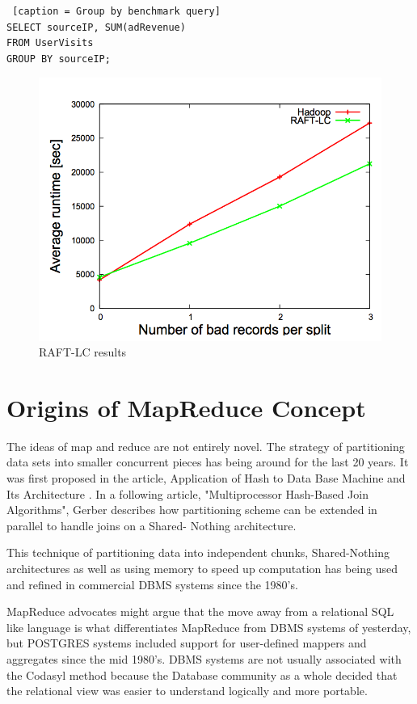 \documentclass[10pt,twocolumn]{IEEEtran11}
\begin{document}
\begin{lstlisting} [caption = Group by benchmark query]
SELECT sourceIP, SUM(adRevenue)
FROM UserVisits
GROUP BY sourceIP;
\end{lstlisting}

\begin{figure}[h]
	\centering
	\includegraphics[scale=0.6]{images/raftBenchmark.png}
	\caption{ RAFT-LC results \protect\cite{quiane2011rafting}}
	\label{fig:raftPerformance}
\end{figure}

\section{Origins of MapReduce Concept}

The ideas of map and reduce are not entirely novel.  The strategy of partitioning  data sets into smaller concurrent pieces has being around for the last 20 years.  It was first proposed in the article, Application of Hash to Data Base Machine and Its Architecture \cite{kitsuregawa1983application}.   In a following article, "Multiprocessor Hash-Based Join Algorithms"\cite{dewitt1985multiprocessor}, Gerber describes how partitioning scheme can be extended in parallel to handle joins on a Shared- Nothing architecture. 
\par
This technique of partitioning data into independent chunks, Shared-Nothing architectures as well as using memory to speed up computation has being used and refined in commercial DBMS systems since the 1980's.
\par
MapReduce advocates might argue that the move away from a relational SQL like language is what differentiates MapReduce from DBMS systems of yesterday, but POSTGRES systems included support for user-defined  mappers and aggregates  since the mid 1980's.  DBMS systems are not usually associated with the Codasyl method because the Database community as a whole decided that the relational view was easier to understand logically and more portable.  
\end{document}
